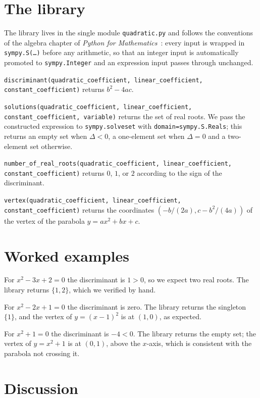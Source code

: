 \documentclass[11pt]{article}
\begin{document}
\section{The library}

The library lives in the single module \texttt{quadratic.py} and
follows the conventions of the algebra chapter of \emph{Python for
Mathematics}~\cite{knight2024}: every input is wrapped in
\texttt{sympy.S(\dots)} before any arithmetic, so that an integer
input is automatically promoted to \texttt{sympy.Integer} and an
expression input passes through unchanged.

\texttt{discriminant(quadratic\_coefficient, linear\_coefficient,
constant\_coefficient)} returns \(b^2 - 4 a c\).

\texttt{solutions(quadratic\_coefficient, linear\_coefficient,
constant\_coefficient, variable)} returns the set of real roots. We
pass the constructed expression to \texttt{sympy.solveset} with
\texttt{domain=sympy.S.Reals}; this returns an empty set when
\(\Delta < 0\), a one-element set when \(\Delta = 0\) and a two-element
set otherwise.

\texttt{number\_of\_real\_roots(quadratic\_coefficient,
linear\_coefficient, constant\_coefficient)} returns \(0\), \(1\), or
\(2\) according to the sign of the discriminant.

\texttt{vertex(quadratic\_coefficient,
linear\_coefficient, constant\_coefficient)} returns the coordinates
\((-b/(2a), c - b^2/(4a))\) of the vertex of the parabola
\(y = a x^2 + b x + c\).

\section{Worked examples}

For \(x^2 - 3 x + 2 = 0\) the discriminant is
\(1 > 0\), so we expect two real roots. The library returns
\(\{1, 2\}\), which we verified by hand.

For \(x^2 - 2 x + 1 = 0\) the discriminant
is zero. The library returns the singleton \(\{1\}\), and the vertex
of \(y = (x - 1)^2\) is at \((1, 0)\), as expected.

For \(x^2 + 1 = 0\) the discriminant is
\(-4 < 0\). The library returns the empty set; the vertex of
\(y = x^2 + 1\) is at \((0, 1)\), above the \(x\)-axis, which is
consistent with the parabola not crossing it.

\section{Discussion}
\end{document}
